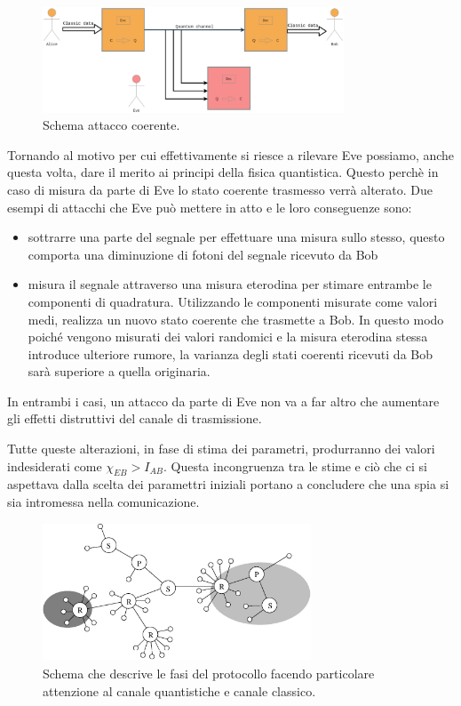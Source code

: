 \begin{itemize}
\begin{figure}[H] 
\begin{center}
\includegraphics[width=0.8\textwidth]{figure/collective_attack.eps} 
\end{center}
\caption{Schema attacco coerente.} \label{fig:attacco-coerente}
\end{figure}
\end{itemize} 

Tornando al motivo per cui effettivamente si riesce a rilevare Eve possiamo, anche questa volta, dare il merito ai principi della fisica quantistica. Questo perch\`e in caso di misura da parte di Eve lo stato coerente trasmesso verr\`a alterato. Due esempi di attacchi che Eve pu\`o mettere in atto e le loro conseguenze sono: 
\begin{itemize}
\item sottrarre una parte del segnale per effettuare una misura sullo stesso, questo comporta una diminuzione di fotoni del segnale ricevuto da Bob
\item misura il segnale attraverso una misura eterodina per stimare entrambe le componenti di quadratura. Utilizzando le componenti misurate come valori medi, realizza un nuovo stato coerente che trasmette a Bob. In questo modo poich\'e vengono misurati dei valori randomici e la misura eterodina stessa introduce ulteriore rumore, la varianza degli stati coerenti ricevuti da Bob sar\`a superiore a quella originaria. 
\end{itemize} 
In entrambi i casi, un attacco da parte di Eve non va a far altro che aumentare gli effetti distruttivi del canale di trasmissione.


Tutte queste alterazioni, in fase di stima dei parametri, produrranno dei valori indesiderati come $\chi_{EB} > I_{AB}$. Questa incongruenza tra le stime e ci\`o che ci si aspettava dalla scelta dei paramettri iniziali portano a concludere che una spia si sia intromessa nella comunicazione. 

\begin{figure}[bht] 
\begin{center}
\includegraphics[width=8cm]{figure/esempio-figura-1.eps} 
\end{center}
\caption{Schema che descrive le fasi del protocollo facendo particolare attenzione al canale quantistiche e canale classico.} 
\end{figure}

